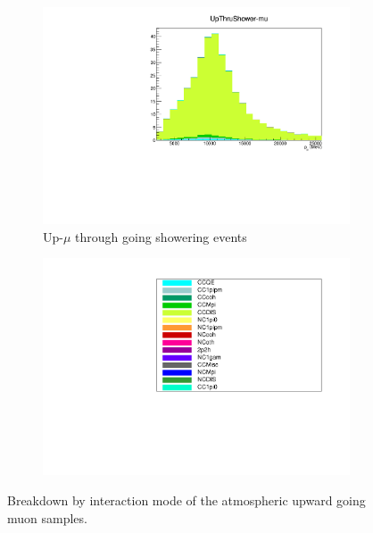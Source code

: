 \begin{figure}[ht]
\begin{subfigure}[t]{0.49\textwidth}
    \includegraphics[width=\textwidth, trim= 0 0 0 30, clip]{Figures/Selections/AtmosphericByMode/UpThruShower-mu_LepMom.pdf}
    \caption{Up-$\mu$ through going showering events}
    \end{subfigure}
    \begin{subfigure}[t]{0.49\textwidth}
    \includegraphics[width=\textwidth, page=1]{Figures/Selections/AtmosphericByMode/Legend.pdf}
    \end{subfigure}

    \caption{Breakdown by interaction mode of the atmospheric upward going muon samples.}
    \label{fig:SKSamples:Upmu}
\end{figure}
